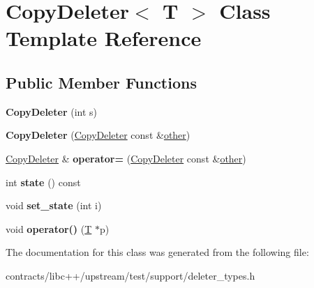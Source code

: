 \hypertarget{class_copy_deleter}{}\section{Copy\+Deleter$<$ T $>$ Class Template Reference}
\label{class_copy_deleter}
\subsection*{Public Member Functions}
\begin{DoxyCompactItemize}
\item 
\mbox{\label{class_copy_deleter_a9e09c203fe29902ab894e5a1b7c48d75}} 
{\bfseries Copy\+Deleter} (int s)
\item 
\mbox{\label{class_copy_deleter_ae7943d0d25741b685f3ef95e91131673}} 
{\bfseries Copy\+Deleter} (\mbox{\hyperlink{class_copy_deleter}{Copy\+Deleter}} const \&\mbox{\hyperlink{structother}{other}})
\item 
\mbox{\label{class_copy_deleter_a8cd5967b9e08d33d63b22842d0287e6a}} 
\mbox{\hyperlink{class_copy_deleter}{Copy\+Deleter}} \& {\bfseries operator=} (\mbox{\hyperlink{class_copy_deleter}{Copy\+Deleter}} const \&\mbox{\hyperlink{structother}{other}})
\item 
\mbox{\label{class_copy_deleter_a06b71f44059a30bebe7e1fd474260b77}} 
int {\bfseries state} () const
\item 
\mbox{\label{class_copy_deleter_ad1b689c7fa6aaa9e078be53bdeb9350f}} 
void {\bfseries set\+\_\+state} (int i)
\item 
\mbox{\label{class_copy_deleter_a73b5dea3f6ad00c1a801303719dbdc82}} 
void {\bfseries operator()} (\mbox{\hyperlink{struct_t}{T}} $\ast$p)
\end{DoxyCompactItemize}


The documentation for this class was generated from the following file\+:\begin{DoxyCompactItemize}
\item 
contracts/libc++/upstream/test/support/deleter\+\_\+types.\+h\end{DoxyCompactItemize}
